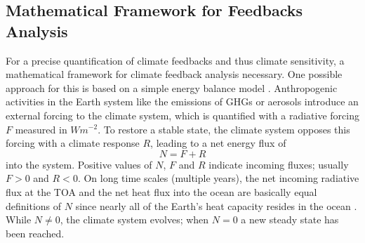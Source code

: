 \subsection{Mathematical Framework for Feedbacks Analysis}
\label{subsec:02:mathematical_framework_feedbacks}

For a precise quantification of climate feedbacks and thus climate sensitivity,
a mathematical framework for climate feedback analysis necessary. One possible
approach for this is based on a simple energy balance model
\autocite{Gregory2009, Roe2009}. Anthropogenic activities in the Earth system
like the emissions of \acp{GHG} or aerosols introduce an external forcing to
the climate system, which is quantified with a radiative forcing $F$ measured
in $\si{W m^{-2}}$. To restore a stable state, the climate system opposes this
forcing with a climate response $R$, leading to a net energy flux of
\begin{equation}
  N = F + R
  \label{eq:02:N}
\end{equation}
into the system. Positive values of $N$, $F$ and $R$ indicate incoming fluxes;
usually $F > 0$ and $R < 0$. On long time scales (multiple years), the net
incoming radiative flux at the \ac{TOA} and the net heat flux into the ocean
are basically equal definitions of $N$ since nearly all of the Earth's heat
capacity resides in the ocean \autocite{Gregory2009}. While $N \neq 0$, the
climate system evolves; when $N = 0$ a new steady state has been reached.

